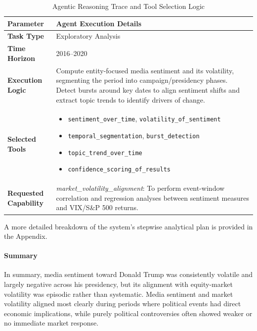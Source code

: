 \begin{table}[h!]
\centering
\caption{Agentic Reasoning Trace and Tool Selection Logic}
\label{tab:agentic_reasoning}
\small
\renewcommand{\arraystretch}{1.4}
\begin{tabular}{@{}p{} p{}@{}}
\toprule
\textbf{Parameter} & \textbf{Agent Execution Details} \\ \midrule
\textbf{Task Type} & Exploratory Analysis \\
\textbf{Time Horizon} & 2016--2020 \\
\textbf{Execution Logic} & Compute entity-focused media sentiment and its volatility, segmenting the period into campaign/presidency phases. Detect bursts around key dates to align sentiment shifts and extract topic trends to identify drivers of change. \\
\textbf{Selected Tools} & \begin{itemize}[nosep, leftmargin=*]
    \item \texttt{sentiment\_over\_time}, \texttt{volatility\_of\_sentiment}
    \item \texttt{temporal\_segmentation}, \texttt{burst\_detection}
    \item \texttt{topic\_trend\_over\_time}
    \item \texttt{confidence\_scoring\_of\_results}
\end{itemize} \\
\textbf{Requested Capability} & \textit{market\_volatility\_alignment}: To perform event-window correlation and regression analyses between sentiment measures and VIX/S\&P 500 returns. \\ \bottomrule
\end{tabular}
\end{table}

A more detailed breakdown of the system's stepwise analytical plan is provided in the Appendix.

\paragraph{Summary}

In summary, media sentiment toward Donald Trump was consistently volatile and largely negative across his presidency, but its alignment with equity-market volatility was episodic rather than systematic. Media sentiment and market volatility aligned most clearly during periods where political events had direct economic implications, while purely political controversies often showed weaker or no immediate market response.

